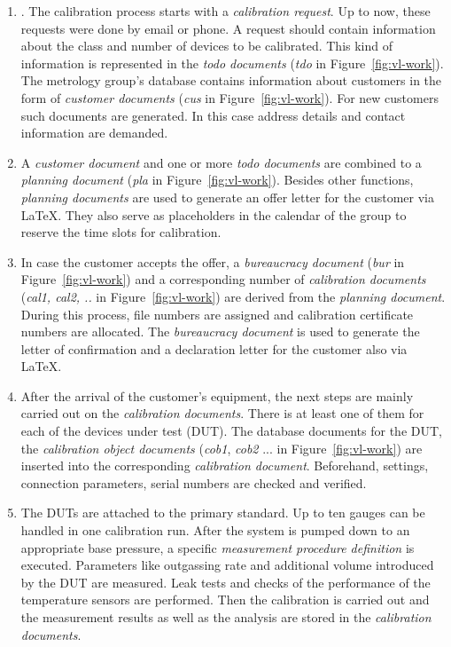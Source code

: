 \documentclass[3p,times,procedia]{elsarticle}
\begin{document}
\begin{enumerate}
  
\item\label{itm:calreq}. The calibration process starts with a \emph{calibration
  request}. Up to now, these requests were done by email or phone. A request
  should contain information about the class and number of devices to be
  calibrated. This kind of information is represented in the \emph{todo
    documents} %
  (\emph{tdo} in Figure~\ref{fig:vl-work}).  The metrology group's database contains
  information about customers in the form of \emph{customer documents}
  (\emph{cus} in Figure~\ref{fig:vl-work}). For new customers such
  documents are generated. In this case address details and contact
  information are demanded. 
  
\item\label{itm:pla} A \emph{customer document} and one or more
  \emph{todo documents} are combined to a \emph{planning document}
  (\emph{pla} in Figure~\ref{fig:vl-work}). Besides other functions,
  \emph{planning documents} are used to generate an offer letter for
  the customer via \LaTeX. They also serve as placeholders in the 
  calendar of the group to reserve the time slots for calibration.  %
  
\item In case the customer accepts the offer, a \emph{bureaucracy
  document} (\emph{bur} in Figure~\ref{fig:vl-work}) and a
  corresponding number of \emph{calibration documents} (\emph{cal1,
    cal2, ..} in Figure~\ref{fig:vl-work}) are derived from the
  \emph{planning document}. During this process, file numbers are
  assigned and calibration certificate numbers are allocated. The
  \emph{bureaucracy document} is used to generate the letter of
  confirmation and a declaration letter for the customer also via
  \LaTeX.

\item After the arrival of the customer's equipment, the next steps are mainly
  carried out on the \emph{calibration documents}. There is at least one of
  them for each of the devices under test (DUT). The database documents
  for the DUT, the \emph{calibration object documents} (\emph{cob1},
  \emph{cob2} ...  in Figure~\ref{fig:vl-work}) are inserted into
  the corresponding \emph{calibration document}. Beforehand, settings,
  connection parameters, serial numbers are checked and verified.

\item The DUTs are attached to the primary standard. Up to ten gauges
  can be handled in one calibration run. After the system is pumped
  down to an appropriate base pressure, a specific \emph{measurement
    procedure definition} is executed. Parameters like outgassing
  rate and additional volume introduced by the DUT are measured. Leak
  tests and checks of the performance of the temperature sensors are performed.
  Then the calibration is carried out and the measurement results as well as
  the analysis are stored in the \emph{calibration documents}.


\end{enumerate}
\end{document}
